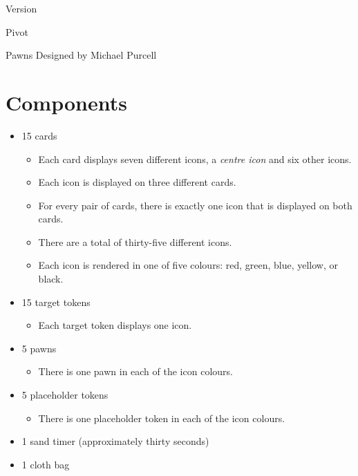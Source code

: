 \documentclass[a6paper, parskip=half, DIV=14, 10pt]{scrartcl}
\begin{document}
{%
\thispagestyle{empty}
		\enlargethispage{3.5\baselineskip} %
\setmainfont[Scale=1.0]{Tex Gyre Schola}
\begin{center}
\makeatletter
{Version \@version}
\makeatother

\vspace{0.5cm}

\setmainfont[Scale=3.0]{Tex Gyre Schola}
\Huge
Pivot\hspace{1.71cm}

\vspace{0.2cm}

Pawns
\vfill{}
\tiny
Designed by Michael Purcell\hspace*{0.86cm}
\end{center}
}%

\newpage
\setmainfont{Tex Gyre Schola}%
\raggedright%
\section*{Components}
\begin{itemize}[leftmargin=*, noitemsep]
	\item 15 cards
      \begin{itemize}[leftmargin=*]
        \item Each card displays seven different icons, a \emph{centre icon} and six other icons.%
        \item Each icon is displayed on three different cards.
        \item For every pair of cards, there is exactly one icon that is displayed on both cards.
        \item There are a total of thirty-five different icons.
        \item Each icon is rendered in one of five colours: red, green, blue, yellow, or black.
      \end{itemize}
    \item 15 target tokens
    \begin{itemize}[leftmargin=*]
      \item Each target token displays one icon.
    \end{itemize}
  \item 5 pawns
      \begin{itemize}[leftmargin=*]
        \item There is one pawn in each of the icon colours.
      \end{itemize}
  \item 5 placeholder tokens
      \begin{itemize}[leftmargin=*]
        \item There is one placeholder token in each of the icon colours.
      \end{itemize}
  \item 1 sand timer (approximately thirty seconds)
  \item 1 cloth bag
\end{itemize}
\end{document}
